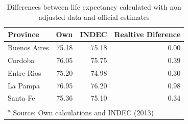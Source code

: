 \documentclass[12pt,]{article}
\begin{document}
\begin{table}

\caption{\label{tab:Dif_e0_INDEC}Differences between life expectancy calculated with non adjusted data and official estimates}
\centering
\begin{tabular}[t]{l|r|r|r}
\hline
Province & Own & INDEC & Realtive Diference\\
\hline
Buenos Aires & 75.18 & 75.18 & 0.00\\
\hline
Cordoba & 76.05 & 75.75 & 0.39\\
\hline
Entre Rios & 75.20 & 74.98 & 0.30\\
\hline
La Pampa & 76.95 & 76.20 & 0.98\\
\hline
Santa Fe & 75.36 & 75.10 & 0.34\\
\hline
\multicolumn{4}{l}{\textsuperscript{a} Source: Own calculations and INDEC (2013)}\\
\end{tabular}
\end{table}
\end{document}
